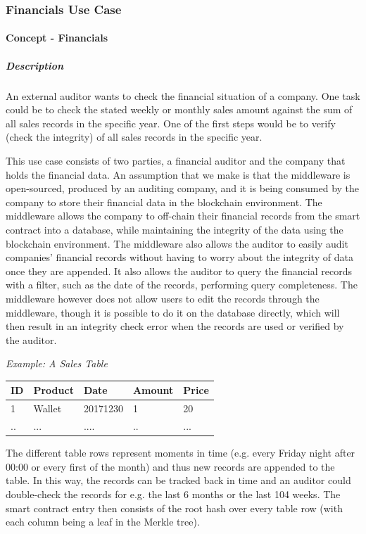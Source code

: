 \subsubsection{Financials Use Case}

\paragraph{Concept - Financials}
\subparagraph{Description}
An external auditor wants to check the financial situation of a company. One task could be to check the stated weekly or monthly sales amount against the sum of all sales records in the specific year. One of the first steps would be to verify (check the integrity) of all sales records in the specific year.

This use case consists of two parties, a financial auditor and the company that holds the financial data. An assumption that we make is that the middleware is open-sourced, produced by an auditing company, and it is being consumed by the company to store their financial data in the blockchain environment. The middleware allows the company to off-chain their financial records from the smart contract into a database, while maintaining the integrity of the data using the blockchain environment. The middleware also allows the auditor to easily audit companies’ financial records without having to worry about the integrity of data once they are appended. It also allows the auditor to query the financial records with a filter, such as the date of the records, performing query completeness. The middleware however does not allow users to edit the records through the middleware, though it is possible to do it on the database directly, which will then result in an integrity check error when the records are used or verified by the auditor.

\textit{Example: A Sales Table}
\begin{center}
    \begin{tabular}{| l | l | l | l | l |}
    \hline
    ID & Product & Date & Amount & Price \\ \hline
    1 & Wallet & 20171230 & 1 & 20 \\ \hline
    .. & ... & .... & .. & ... \\ \hline
    \end{tabular}
\end{center}

The different table rows represent moments in time (e.g. every Friday night after 00:00 or every first of the month) and thus new records are appended to the table. In this way, the records can be tracked back in time and an auditor could double-check the records for e.g. the last 6 months or the last 104 weeks. The smart contract entry then consists of the root hash over every table row (with each column being a leaf in the Merkle tree).

